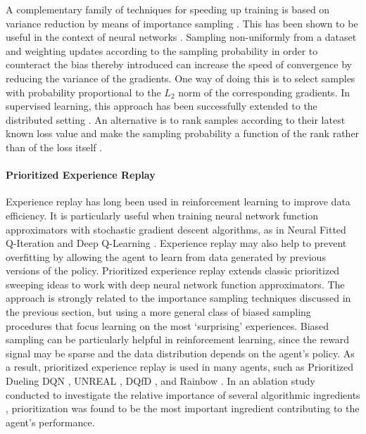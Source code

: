 \documentclass{article} \PassOptionsToPackage{usenames,dvipsnames}{xcolor}
\begin{document}
A complementary family of techniques for speeding up training is based on variance reduction by means of importance sampling \citep[cf.][]{hastings1970monte}. This has been shown to be useful in the context of neural networks \citep{Hinton2007-vs}. Sampling non-uniformly from a dataset and weighting updates according to the sampling probability in order to counteract the bias thereby introduced can increase the speed of convergence by reducing the variance of the gradients. One way of doing this is to select samples with probability proportional to the $L_2$ norm of the corresponding gradients. In supervised learning, this approach has been successfully extended to the distributed setting \citep{alain2015variance}. An alternative is to rank samples according to their latest known loss value and make the sampling probability a function of the rank rather than of the loss itself \citep{loshchilov2015online}.

\paragraph{Prioritized Experience Replay}

Experience replay \citep{experience-replay} has long been used in reinforcement learning to improve data efficiency. It is particularly useful when training neural network function approximators with stochastic gradient descent algorithms, as in Neural Fitted Q-Iteration \citep{nfq} and Deep Q-Learning \citep{dqn}. Experience replay may also help to prevent overfitting by allowing the agent to learn from data generated by previous versions of the policy. Prioritized experience replay \citep{prioritized-replay} extends classic prioritized sweeping ideas \citep{prioritized-sweeping} to work with deep neural network function approximators. The approach is strongly related to the importance sampling techniques discussed in the previous section, but using a more general class of biased sampling procedures that focus learning on the most `surprising' experiences. Biased sampling can be particularly helpful in reinforcement learning, since the reward signal may be sparse and the data distribution depends on the agent's policy. As a result, prioritized experience replay is used in many agents, such as Prioritized Dueling DQN \citep{dueling}, UNREAL \citep{unreal}, DQfD \citep{dqfd}, and Rainbow \citep{rainbow}. In an ablation study conducted to investigate the relative importance of several algorithmic ingredients \citep{rainbow}, prioritization was found to be the most important ingredient contributing to the agent's performance. 
\end{document}
